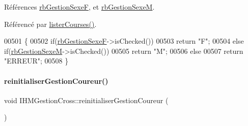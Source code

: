 Références \hyperlink{class_i_h_m_gestion_cross_a4474ef47310eb3511befdf1beaa18b56}{rb\+Gestion\+SexeF}, et \hyperlink{class_i_h_m_gestion_cross_a7d471a7f96862dcd302f7f8cc52dfea4}{rb\+Gestion\+SexeM}.



Référencé par \hyperlink{class_i_h_m_gestion_cross_a34567afe3e94862ebd9af51528dedb65}{lister\+Courses()}.


\begin{DoxyCode}
00501 \{
00502     \textcolor{keywordflow}{if}(\hyperlink{class_i_h_m_gestion_cross_a4474ef47310eb3511befdf1beaa18b56}{rbGestionSexeF}->isChecked())
00503         \textcolor{keywordflow}{return} \textcolor{stringliteral}{"F"};
00504     \textcolor{keywordflow}{else} \textcolor{keywordflow}{if}(\hyperlink{class_i_h_m_gestion_cross_a7d471a7f96862dcd302f7f8cc52dfea4}{rbGestionSexeM}->isChecked())
00505         \textcolor{keywordflow}{return} \textcolor{stringliteral}{"M"};
00506     \textcolor{keywordflow}{else}
00507         \textcolor{keywordflow}{return} \textcolor{stringliteral}{"ERREUR"};
00508 \}
\end{DoxyCode}
\mbox{\label{class_i_h_m_gestion_cross_a85c44933ec0dcbb591e01c832063367e}} 
\paragraph{\texorpdfstring{reinitialiser\+Gestion\+Coureur()}{reinitialiserGestionCoureur()}}
{\footnotesize\ttfamily void I\+H\+M\+Gestion\+Cross\+::reinitialiser\+Gestion\+Coureur (\begin{DoxyParamCaption}{ }\end{DoxyParamCaption})\hspace{0.3cm}{\ttfamily [private]}}



